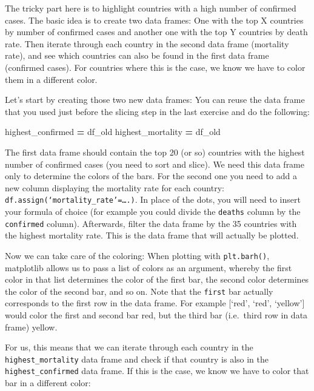 \documentclass[
  11pt,
]{article}
\newenvironment{Shaded}{\begin{snugshade}}{\end{snugshade}}
\newcommand{\NormalTok}[1]{#1}
\newcommand{\OperatorTok}[1]{\textcolor[rgb]{0.81,0.36,0.00}{\textbf{#1}}}
\newenvironment{tipsp}[1]
  {
  \begin{itemize}
  \footnotesize
  \renewcommand{\labelitemi}{
    \raisebox{-.7\height}[0pt][0pt]{
      {\setkeys{Gin}{width=3em,keepaspectratio}
        \texttt{[image: images/\#1.png]}}
    }
  }
  \setlength{\fboxsep}{1em}
  \begin{pbox}
  \item
  }
  {
  \end{pbox}
  \end{itemize}
  }
\begin{document}
\begin{tipsp}p

The tricky part here is to highlight countries with a high number of confirmed cases.
The basic idea is to create two data frames: One with the top X countries by number of confirmed cases and another one with the top Y countries by death rate. Then iterate through each country in the second data frame (mortality rate), and see which countries can also be found in the first data frame (confirmed cases).
For countries where this is the case, we know we have to color them in a different color.

Let's start by creating those two new data frames: You can reuse the data frame that you used just before the slicing step in the last exercise and do the following:

\begin{Shaded}
\begin{Highlighting}[]
\NormalTok{highest\_confirmed }\OperatorTok{=}\NormalTok{ df\_old}
\NormalTok{highest\_mortality }\OperatorTok{=}\NormalTok{ df\_old}
\end{Highlighting}
\end{Shaded}

The first data frame should contain the top 20 (or so) countries with the highest number of confirmed cases (you need to sort and slice). We need this data frame only to determine the colors of the bars.
For the second one you need to add a new column displaying the mortality rate for each country: \texttt{df.assign(‘mortality\_rate’=\ldots{}.)}. In place of the dots, you will need to insert your formula of choice (for example you could divide the \texttt{deaths} column by the \texttt{confirmed} column). Afterwards, filter the data frame by the 35 countries with the highest mortality rate. This is the data frame that will actually be plotted.

Now we can take care of the coloring: When plotting with \texttt{plt.barh()}, matplotlib allows us to pass a list of colors as an argument, whereby the first color in that list determines the color of the first bar, the second color determines the color of the second bar, and so on. Note that the \texttt{first} bar actually corresponds to the first row in the data frame.
For example {[}`red', `red', `yellow'{]} would color the first and second bar red, but the third bar (i.e.~third row in data frame) yellow.

For us, this means that we can iterate through each country in the \texttt{highest\_mortality} data frame and check if that country is also in the \texttt{highest\_confirmed} data frame. If this is the case, we know we have to color that bar in a different color:


\end{tipsp}
\end{document}
